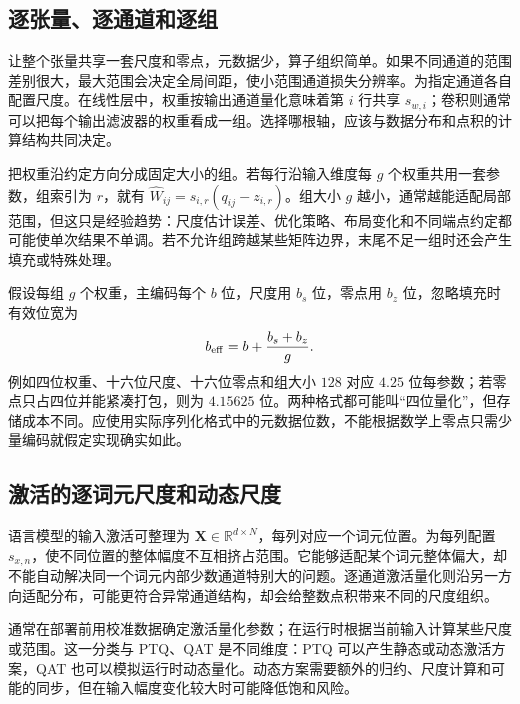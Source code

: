 \documentclass[UTF8,12pt,a4paper,fontset=fandol]{ctexart}
\begin{document}
\subsection{逐张量、逐通道和逐组}
让整个张量共享一套尺度和零点，元数据少，算子组织简单。如果不同通道的范围差别很大，最大范围会决定全局间距，使小范围通道损失分辨率。为指定通道各自配置尺度。在线性层中，权重按输出通道量化意味着第 $i$ 行共享 $s_{w,i}$；卷积则通常可以把每个输出滤波器的权重看成一组。选择哪根轴，应该与数据分布和点积的计算结构共同决定。

把权重沿约定方向分成固定大小的组。若每行沿输入维度每 $g$ 个权重共用一套参数，组索引为 $r$，就有 $\widehat W_{ij}=s_{i,r}(q_{ij}-z_{i,r})$。组大小 $g$ 越小，通常越能适配局部范围，但这只是经验趋势：尺度估计误差、优化策略、布局变化和不同端点约定都可能使单次结果不单调。若不允许组跨越某些矩阵边界，末尾不足一组时还会产生填充或特殊处理。

假设每组 $g$ 个权重，主编码每个 $b$ 位，尺度用 $b_s$ 位，零点用 $b_z$ 位，忽略填充时有效位宽为
\begin{equation}
 b_{\rm eff}=b+\frac{b_s+b_z}{g}.
 \label{eq:quant-effective-bits}
\end{equation}
例如四位权重、十六位尺度、十六位零点和组大小 $128$ 对应 $4.25$ 位每参数；若零点只占四位并能紧凑打包，则为 $4.15625$ 位。两种格式都可能叫“四位量化”，但存储成本不同。应使用实际序列化格式中的元数据位数，不能根据数学上零点只需少量编码就假定实现确实如此。

\subsection{激活的逐词元尺度和动态尺度}
语言模型的输入激活可整理为 $\mathbf X\in\mathbb R^{d\times N}$，每列对应一个词元位置。为每列配置 $s_{x,n}$，使不同位置的整体幅度不互相挤占范围。它能够适配某个词元整体偏大，却不能自动解决同一个词元内部少数通道特别大的问题。逐通道激活量化则沿另一方向适配分布，可能更符合异常通道结构，却会给整数点积带来不同的尺度组织。

通常在部署前用校准数据确定激活量化参数；在运行时根据当前输入计算某些尺度或范围。这一分类与 PTQ、QAT 是不同维度：PTQ 可以产生静态或动态激活方案，QAT 也可以模拟运行时动态量化。动态方案需要额外的归约、尺度计算和可能的同步，但在输入幅度变化较大时可能降低饱和风险。
\end{document}
